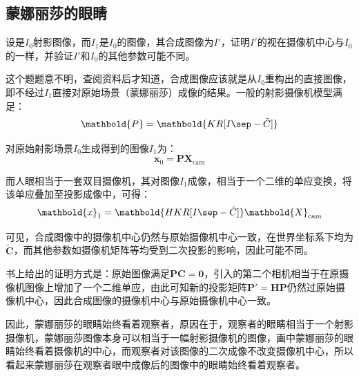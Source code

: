 \documentclass[11pt]{article}
\begin{document}
\subsection{蒙娜丽莎的眼睛}
{\heiti 设是$I_0$射影图像，而$I_1$是$I_0$的图像，其合成图像为$I'$，证明$I'$的视在摄像机中心与$I_0$的一样，并验证$I'$和$I_0$的其他参数可能不同。}\par
这个题题意不明，查阅资料\cite{MultipleViewGeometry}后才知道，合成图像应该就是从$I_0$重构出的直接图像，即不经过$I_1$直接对原始场景（蒙娜丽莎）成像的结果。一般的射影摄像机模型满足：
\begin{equation*}
  \mathbold{P}=\mathbold{KR[I\sep -\tilde{C}]}
\end{equation*}\par
对原始射影场景$I_0$生成得到的图像$I_1$为：
\begin{equation*}
  \mathbold{x}_0=\mathbold{P}\mathbold{X}_\mathrm{cam}
\end{equation*}\par
而人眼相当于一套双目摄像机，其对图像$I_1$成像，相当于一个二维的单应变换，将该单应叠加至投影成像中，可得：
\begin{equation*}
  \mathbold{x}_1=\mathbold{HKR[I\sep -\tilde{C}]}\mathbold{X}_\mathrm{cam}
\end{equation*}\par
可见，合成图像中的摄像机中心仍然与原始摄像机中心一致，在世界坐标系下均为$\tilde{\mathbf{C}}$，而其他参数如摄像机矩阵等均受到二次投影的影响，因此可能不同。\par
书上给出的证明方式是：原始图像满足$\mathbf{PC=0}$，引入的第二个相机相当于在原摄像机图像上增加了一个二维单应，由此可知新的投影矩阵$\mathbf{P}'=\mathbf{HP}$仍然过原始摄像机中心，因此合成图像的摄像机中心与原始摄像机中心一致。\par
因此，蒙娜丽莎的眼睛始终看着观察者，原因在于，观察者的眼睛相当于一个射影摄像机，蒙娜丽莎图像本身可以相当于一幅射影摄像机的图像，画中蒙娜丽莎的眼睛始终看着摄像机的中心，而观察者对该图像的二次成像不改变摄像机中心，所以看起来蒙娜丽莎在观察者眼中成像后的图像中的眼睛始终看着观察者。
\end{document}
